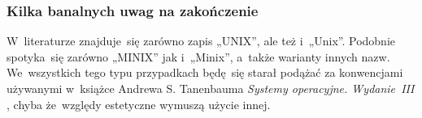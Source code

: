 \documentclass[10pt,t]{beamer}
\begin{document}
\begin{frame}
  \frametitle{Kilka banalnych uwag na zakończenie}


  W~literaturze znajduje~się zarówno zapis „UNIX”, ale też i~„Unix”.
  Podobnie spotyka~się zarówno „MINIX” jak i~„Minix”, a~także warianty
  innych nazw. We~wszystkich tego typu przypadkach będę~się starał podążać
  za konwencjami używanymi w~książce Andrewa S. Tanenbauma \textit{Systemy
    operacyjne. Wydanie~III}
  \parencite{Tannenbaum-Systemy-Operacyjne-Wydanie-III-Pub-2013}, chyba
  że~względy estetyczne wymuszą użycie innej.

\end{frame}





























































\end{document}

